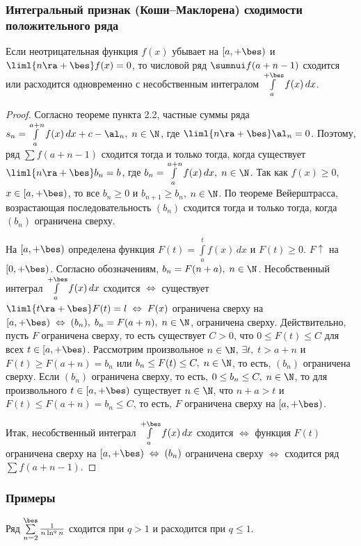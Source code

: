 \documentclass[a4paper]{article}
\begin{document}
\subsubsection{Интегральный признак (Коши--Маклорена) сходимости
положительного ряда}

\begin{theorem}
Если неотрицательная функция $f(x)$ убывает на $[a,+\bes)$ и
$\liml{n\ra+\bes} f(x) = 0$, то числовой ряд $\sumnui f(a+n-1)$
сходится или расходится одновременно с несобственным интегралом
$\int\limits_a^{+\bes} f(x)\,dx$.
\end{theorem}

\begin{proof}
Согласно теореме пункта 2.2, частные суммы ряда $s_n =
\int\limits_{a}^{a+n} f(x)\,dx + c - \al_n, \; n\in\N$, где
$\liml{n\ra+\bes}\al_n=0$. Поэтому, ряд $\sum f(a+n-1)$ сходится
тогда и только тогда, когда существует $\liml{n\ra+\bes}b_n=b$, где
$b_n = \int\limits_a^{a+n} f(x)\,dx, \; n\in\N$. Так как $f(x)\ge0$,
$x\in[a,+\bes)$, то все $b_n\ge0$ и $b_{n+1}\ge b_n$, $n\in\N$. По
теореме Вейерштрасса, возрастающая последовательность $(b_n)$
сходится тогда и только тогда, когда $(b_n)$ ограничена сверху.

На $[a,+\bes)$ определена функция $F(t) = \int\limits_a^t f(x)\,dx$
и $F(t)\ge0$. $F\uparrow$ на $[0,+\bes)$. Согласно обозначениям,
$b_n = F(n+a), \; n\in\N$. Несобственный интеграл
$\int\limits_a^{+\bes} f(x)\,dx$ сходится $\Leftrightarrow$
существует $\liml{t\ra+\bes} F(t) = l \; \Leftrightarrow \; F(x)$
ограничена сверху на $[a,+\bes) \; \Leftrightarrow \; (b_n), \; b_n
= F(a+n), \; n\in\N$, ограничена сверху. Действительно, пусть $F$
ограничена сверху, то есть существует $C>0$, что $0 \le F(t) \le C$
для всех $t\in[a,+\bes)$. Рассмотрим произвольное $n\in\N$, $\exi t,
\; t>a+n$ и $F(t)\ge F(a+n)=b_n$ или $b_n \le F(t) \le C, \;
n\in\N$, то есть, $(b_n)$ ограничена сверху. Если $(b_n)$ ограничена
сверху, то есть, $0\le b_n \le C, \; n\in\N$, то для произвольного
$t\in[a,+\bes)$ существует $n\in\N$, что $n+a>t$ и $F(t) \le F(a+n)
= b_n \le C$, то есть, $F$ ограничена сверху на $[a,+\bes)$.

Итак, несобственный интеграл $\int\limits_a^{+\bes} f(x)\,dx$
сходится $\Leftrightarrow$ функция $F(t)$ ограничена сверху на
$[a,+\bes) \; \Leftrightarrow \; (b_n)$ ограничена сверху
$\Leftrightarrow$ сходится ряд $\sum f(a+n-1)$.
\end{proof}

\subsubsection{Примеры}
Ряд $\sum\limits_{n=2}^{\bes} \frac1{n\ln^qn}$ сходится при $q>1$ и
расходится при $q\le1$.
\end{document}
